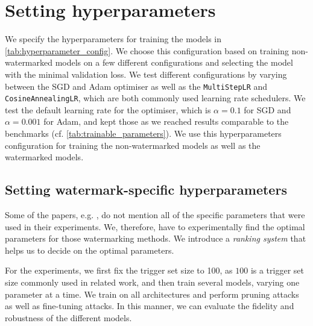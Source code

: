 

\section{Setting hyperparameters}

We specify the hyperparameters for training the models in \cref{tab:hyperparameter_config}. We choose this configuration based on training non-watermarked models on a few different configurations and selecting the model with the minimal validation loss. We test different configurations by varying between the SGD and Adam optimiser as well as the \texttt{MultiStepLR} and \texttt{CosineAnnealingLR}, which are both commonly used learning rate schedulers. We test the default learning rate for the optimiser, which is $\alpha=0.1$ for SGD and $\alpha=0.001$ for Adam, and kept those as we reached results comparable to the benchmarks (cf. \cref{tab:trainable_parameters}). We use this hyperparameters configuration for training the non-watermarked models as well as the watermarked models.




\subsection{Setting watermark-specific hyperparameters} \label{sec:studysettings:watermark-spec}

Some of the papers, e.g. \cite{guo_watermarking_2018}, do not mention all of the specific parameters that were used in their experiments. We, therefore, have to experimentally find the optimal parameters for those watermarking methods. We introduce a \textit{ranking system} that helps us to decide on the optimal parameters. 

For the experiments, we first fix the trigger set size to 100, as $100$ is a trigger set size commonly used in related work, and then train several models, varying one parameter at a time. We train on all architectures and perform pruning attacks as well as fine-tuning attacks. In this manner, we can evaluate the fidelity and robustness of the different models.

